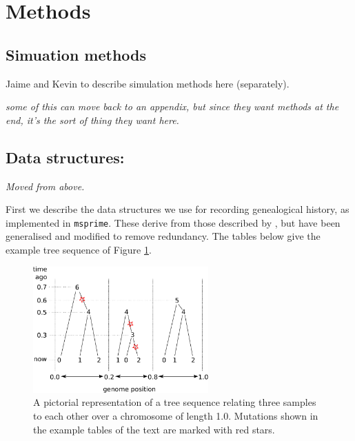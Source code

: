 \documentclass{article}
\newcommand{\msprime}{\texttt{msprime}}
\newcommand{\plr}[1]{{\em \color{blue} #1}}
\newcommand{\jk}[1]{{\em \color{red} #1}}
\begin{document}
\section*{Methods}

\subsection*{Simuation methods}

Jaime and Kevin to describe simulation methods here (separately).


\plr{some of this can move back to an appendix, but since they want methods at the end,
it's the sort of thing they want here.}

\subsection*{Data structures:}
\jk{Moved from above.}

First we describe the data structures we use for recording genealogical history,
as implemented in \msprime.
These derive from those described by \citet{kelleher2016efficient},
but have been generalised and modified to remove redundancy.
The tables below give the example tree sequence of Figure \ref{fig:ex_tree_seq}.

\begin{figure}
    \begin{center}
        \includegraphics[width=0.6\textwidth]{example_tree_seq}
    \end{center}
    \caption{
        A pictorial representation of a tree sequence
        relating three samples to each other
        over a chromosome of length 1.0.
        Mutations shown in the example tables of the text
        are marked with red stars.
        \label{fig:ex_tree_seq}
    }
\end{figure}
\end{document}
